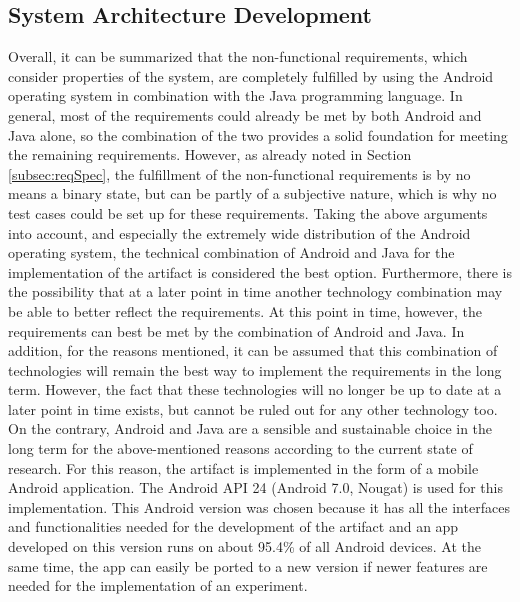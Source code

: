 \subsection{System Architecture Development}

Overall, it can be summarized that the non-functional requirements, which consider properties of the system, are completely fulfilled by using the Android operating system in combination with the Java programming language. In general, most of the requirements could already be met by both Android and Java alone, so the combination of the two provides a solid foundation for meeting the remaining requirements. However, as already noted in Section \ref{subsec:reqSpec}, the fulfillment of the non-functional requirements is by no means a binary state, but can be partly of a subjective nature, which is why no test cases could be set up for these requirements. Taking the above arguments into account, and especially the extremely wide distribution of the Android operating system, the technical combination of Android and Java for the implementation of the artifact is considered the best option. Furthermore, there is the possibility that at a later point in time another technology combination may be able to better reflect the requirements. At this point in time, however, the requirements can best be met by the combination of Android and Java. In addition, for the reasons mentioned, it can be assumed that this combination of technologies will remain the best way to implement the requirements in the long term. However, the fact that these technologies will no longer be up to date at a later point in time exists, but cannot be ruled out for any other technology too. On the contrary, Android and Java are a sensible and sustainable choice in the long term for the above-mentioned reasons according to the current state of research. For this reason, the artifact is implemented in the form of a mobile Android application. The Android API 24 (Android 7.0, Nougat) is used for this implementation. This Android version was chosen because it has all the interfaces and functionalities needed for the development of the artifact and an app developed on this version runs on about 95.4\% of all Android devices. At the same time, the app can easily be ported to a new version if newer features are needed for the implementation of an experiment.

